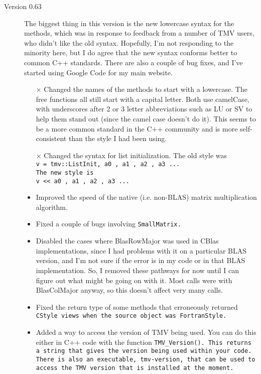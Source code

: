\begin{description}
\item[Version 0.63]
The biggest thing in this version is the new lowercase syntax for the
methods, which was in response to feedback from a number of TMV users, 
who didn't like the old syntax.  Hopefully, I'm not responding to the 
minority here, but I do agree that the new syntax conforms better
to common C++ standards.  There are also a couple of bug fixes, and I've
started using Google Code for my main website.

\begin{itemize}

\item[$\times$]
Changed the names of the methods to start with a lowercase.
The free functions all still start with a capital letter.
Both use camelCase, with underscores after 2 or 3 letter abbreviations
such as LU or SV to help them stand out (since the camel case doesn't do it).
This seems to be a more common standard in the C++ community and is more
self-consistent than the style I had been using.

\item[$\times$]
Changed the syntax for list initialization.
The old style was \\
\tt{v = tmv::ListInit, a0 , a1 , a2 , a3  ...}\\
The new style is \\
\tt{v << a0 , a1 , a2 , a3 ...}\\

\item
Improved the speed of the native (i.e. non-BLAS) matrix multiplication algorithm.

\item
Fixed a couple of bugs involving \tt{SmallMatrix}.  

\item
Disabled the cases where BlasRowMajor was used in CBlas implementations, 
since I had problems
with it on a particular BLAS version, and I'm not sure if the error
is in my code or in that BLAS implementation.
So, I removed these pathways for now until I can figure out what might
be going on with it.  Most calls were with BlasColMajor anyway, so this
doesn't affect very many calls.

\item
Fixed the return type of some methods that erroneously returned \tt{CStyle}
views when the source object was \tt{FortranStyle}.

\item
Added a way to access the version of TMV being used.
You can do this either in C++ code with the function \tt{TMV\_Version()}.
This returns a string that gives the version being used within your code.
There is also an executable, \tt{tmv-version}, that can be used to access
the TMV version that is installed at the moment.


\end{itemize}
\end{description}
